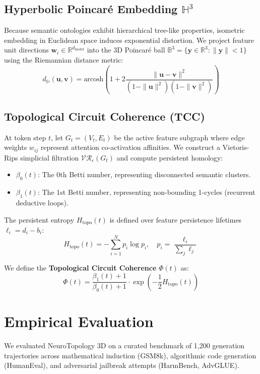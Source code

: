 \documentclass[10pt,journal,compsoc]{IEEEtran}
\begin{document}
\subsection{Hyperbolic Poincaré Embedding $\mathbb{H}^3$}
Because semantic ontologies exhibit hierarchical tree-like properties, isometric embedding in Euclidean space induces exponential distortion. We project feature unit directions $\mathbf{w}_i \in \mathbb{R}^{d_{\text{model}}}$ into the 3D Poincar\'e ball $\mathbb{B}^3 = \{\mathbf{y} \in \mathbb{R}^3 : \|\mathbf{y}\| < 1\}$ using the Riemannian distance metric:
\begin{equation}
    d_{\mathbb{H}}(\mathbf{u}, \mathbf{v}) = \text{arcosh}\left(1 + 2\frac{\|\mathbf{u} - \mathbf{v}\|^2}{(1 - \|\mathbf{u}\|^2)(1 - \|\mathbf{v}\|^2)}\right)
\end{equation}

\subsection{Topological Circuit Coherence (TCC)}
At token step $t$, let $G_t = (V_t, E_t)$ be the active feature subgraph where edge weights $w_{ij}$ represent attention co-activation affinities. We construct a Vietoris-Rips simplicial filtration $\mathcal{VR}_\epsilon(G_t)$ and compute persistent homology:
\begin{itemize}
    \item $\beta_0(t)$: The 0th Betti number, representing disconnected semantic clusters.
    \item $\beta_1(t)$: The 1st Betti number, representing non-bounding 1-cycles (recurrent deductive loops).
\end{itemize}

The persistent entropy $H_{\text{topo}}(t)$ is defined over feature persistence lifetimes $\ell_i = d_i - b_i$:
\begin{equation}
    H_{\text{topo}}(t) = -\sum_{i=1}^{N} p_i \log p_i, \quad p_i = \frac{\ell_i}{\sum_j \ell_j}
\end{equation}

We define the \textbf{Topological Circuit Coherence} $\Phi(t)$ as:
\begin{equation}
    \Phi(t) = \frac{\beta_1(t) + 1}{\beta_0(t) + 1} \cdot \exp\left(-\frac{1}{2} H_{\text{topo}}(t)\right)
\end{equation}

\section{Empirical Evaluation}
We evaluated NeuroTopology 3D on a curated benchmark of 1,200 generation trajectories across mathematical induction (GSM8k), algorithmic code generation (HumanEval), and adversarial jailbreak attempts (HarmBench, AdvGLUE).
\end{document}
